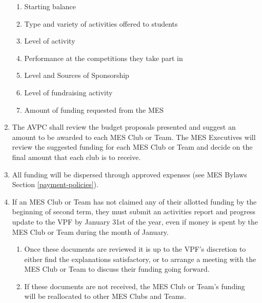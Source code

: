 \begin{enumerate}
  \begin{enumerate}
   \item
    Starting balance
   \item
    Type and variety of activities offered to students
   \item
    Level of activity
   \item
    Performance at the competitions they take part in
   \item
    Level and Sources of Sponsorship
   \item
    Level of fundraising activity
   \item
    Amount of funding requested from the MES
  \end{enumerate}
 \item
  The AVPC shall review the budget proposals presented and suggest an
  amount to be awarded to each MES Club or Team. The MES Executives will
  review the suggested funding for each MES Club or Team and decide on
  the final amount that each club is to receive.
 \item
  All funding will be dispersed through approved expenses (see MES
  Bylaws Section \ref{payment-policies}). %
 \item
  If an MES Club or Team has not claimed any of their allotted funding
  by the beginning of second term, they must submit an activities report
  and progress update to the VPF by January 31st of the year, even if
  money is spent by the MES Club or Team during the month of January.

  \begin{enumerate}
   \item
    Once these documents are reviewed it is up to the VPF's discretion
    to either find the explanations satisfactory, or to arrange a
    meeting with the MES Club or Team to discuss their funding going
    forward.
   \item
    If these documents are not received, the MES Club or Team's funding
    will be reallocated to other MES Clubs and Teams.

  \end{enumerate}
\end{enumerate}

